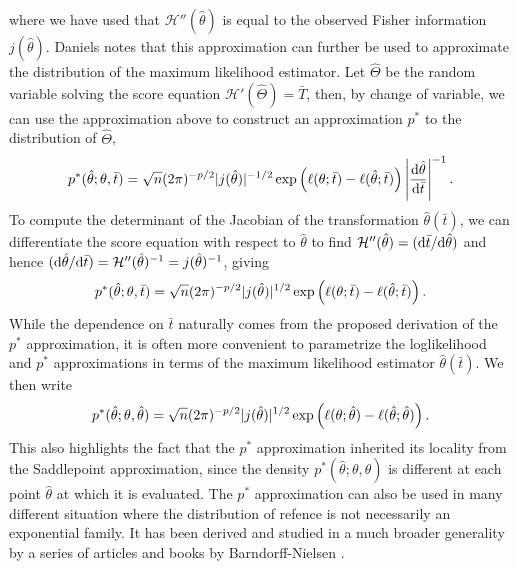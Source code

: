where we have used that $\mathcal{H}''(\hat\theta)$ is equal to the observed Fisher information $j(\hat\theta)$. Daniels \cite{daniels1958} notes that this approximation can further be used to approximate the distribution of the maximum likelihood estimator. Let $\hat\Theta$ be the random variable solving the score equation $\mathcal{H}'(\hat\Theta) = \bar T$, then, by change of variable, we can use the approximation above to construct an approximation $p^*$ to the distribution of $\hat\Theta$,
\begin{equation*}
    p^*(\hat\theta; \theta, \bar t) = \sqrt{n} (2\pi)^{-p/2}|j(\hat\theta)|^{-1/2} \exp\left(\ell(\theta; \bar t) - \ell(\hat\theta; \bar t)\right) \left|\frac{\text{d} \hat\theta}{\text{d} \bar t}\right|^{-1}.
\end{equation*}
To compute the determinant of the Jacobian of the transformation $\hat\theta(\bar t)$, we can differentiate the score equation with respect to $\hat\theta$ to find $\mathcal{H}''(\hat\theta) = (\text{d} \bar t / \text{d} \hat\theta)$ and hence $(\text{d} \hat\theta / \text{d} \bar t) = \mathcal{H}''(\hat\theta)^{-1} = j(\hat\theta)^{-1}$, giving
\begin{equation} \label{eq-pstar}
    p^*(\hat\theta; \theta, \bar t) = \sqrt{n} (2\pi)^{-p/2}|j(\hat\theta)|^{1/2} \exp\left(\ell(\theta; \bar t) - \ell(\hat\theta; \bar t)\right).
\end{equation}
While the dependence on $\bar t$ naturally comes from the proposed derivation of the $p^*$ approximation, it is often more convenient to parametrize the loglikelihood and $p^*$ approximations in terms of the maximum likelihood estimator $\hat\theta(\bar t)$. We then write
\begin{equation*}
    p^*(\hat\theta; \theta, \hat\theta) = \sqrt{n} (2\pi)^{-p/2}|j(\hat\theta)|^{1/2} \exp\left(\ell(\theta; \hat\theta) - \ell(\hat\theta; \hat\theta)\right).
\end{equation*}
This also highlights the fact that the $p^*$ approximation inherited its locality from the Saddlepoint approximation, since the density $p^*(\hat\theta; \theta, \hat\theta)$ is different at each point $\hat\theta$ at which it is evaluated. The $p^*$ approximation can also be used in many different situation where the distribution of refence is not necessarily an exponential family. It has been derived and studied in a much broader generality by a series of articles and books by Barndorff-Nielsen \cite{BarndorffNielsen1980,BarndorffNielsen1983}.  

